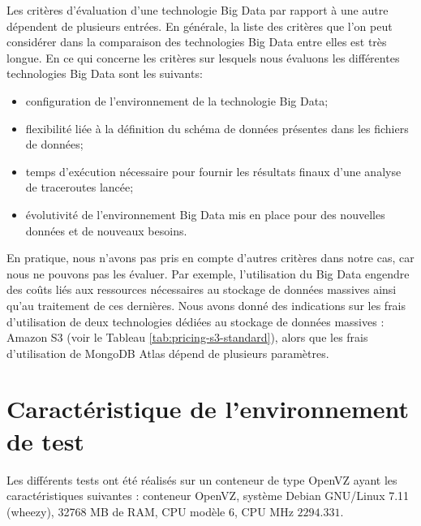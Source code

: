 Les critères d'évaluation d'une technologie Big Data par rapport à une autre dépendent de plusieurs entrées.  En générale, la liste des critères que l'on peut considérer dans la comparaison des technologies Big Data entre elles est très longue.  En ce qui concerne les critères sur lesquels nous  évaluons  les différentes technologies  Big Data sont les suivants:
\begin{itemize}
\item configuration de l'environnement de la technologie Big Data;
\item flexibilité liée à la définition du  schéma de  données présentes dans les fichiers de données;
\item temps d'exécution nécessaire pour fournir les résultats finaux d'une analyse de traceroutes lancée;
\item évolutivité de l'environnement Big Data mis en place pour des nouvelles données et de nouveaux besoins.

\end{itemize}
En pratique, nous n'avons pas pris en compte d'autres critères dans notre cas, car nous ne pouvons pas les évaluer. Par exemple, l'utilisation du  Big Data engendre des coûts  liés aux ressources nécessaires au stockage de données massives ainsi qu'au traitement de ces dernières. Nous avons donné des indications sur les frais d'utilisation de deux technologies dédiées au stockage de données massives : Amazon S3 (voir le Tableau \ref{tab:pricing-s3-standard}), alors que les frais d'utilisation de MongoDB Atlas dépend de plusieurs paramètres. 

\section{Caractéristique de l'environnement de test}

Les différents tests ont été réalisés sur un conteneur de type OpenVZ ayant les caractéristiques suivantes : conteneur OpenVZ, système Debian GNU/Linux 7.11 (wheezy),  32768 MB de  RAM,  CPU  modèle $6$, CPU MHz $ 2294.331 $.



